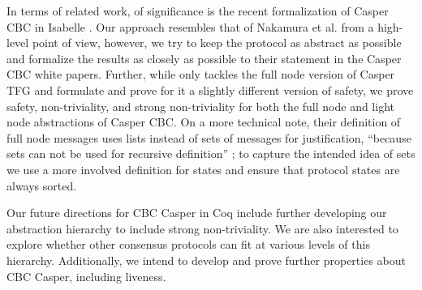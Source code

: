 In terms of related work, of significance is the recent formalization of Casper CBC in Isabelle \cite{Nakamura}.
Our approach resembles that of Nakamura et al. from a high-level point of view, however, we try to keep the protocol as abstract as possible and formalize the results as closely as possible to their statement in the Casper CBC white papers.
Further, while \cite{Nakamura} only tackles the full node version of Casper TFG and formulate and prove for it a slightly different version of safety, we prove safety, non-triviality, and strong non-triviality for both the full node and light node abstractions of Casper CBC.
On a more technical note, their definition of full node messages uses lists instead of sets of messages for justification, ``because sets can not be used for recursive definition'' \cite{Nakamura-github}; to capture the intended idea of sets we use a more involved definition for states and ensure that protocol states are always sorted.

Our future directions for CBC Casper in Coq include further developing our abstraction hierarchy to include strong non-triviality. We are also interested to explore whether other consensus protocols can fit at various levels of this hierarchy. Additionally, we intend to develop and prove further properties about CBC Casper, including liveness.